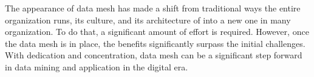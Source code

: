 \documentclass[12pt, a4paper]{book}
\begin{document}
The appearance of data mesh has made a shift from traditional ways the entire organization runs, its culture, and its architecture of into a new one in many organization. To do that, a significant amount of effort is required. However, once the data mesh is in place, the benefits significantly surpass the initial challenges. With dedication and concentration, data mesh can be a significant step forward in data mining and application in the digital era.

\begingroup
\backmatter
{}
\renewcommand\bibname{References}
\endgroup

\clearpage
\end{document}
